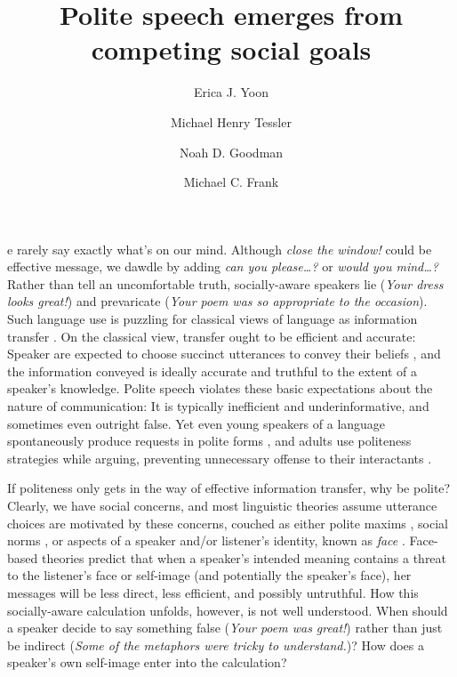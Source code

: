 \documentclass[9pt,twocolumn,twoside,lineno]{main_class_file}
\title{Polite speech emerges from competing social goals}
\author[a,1,2]{Erica J. Yoon}
\author[a,1]{ Michael Henry Tessler}
\author[a]{Noah D. Goodman}
\author[a]{Michael C. Frank}
\affil[a]{Department of Psychology, Stanford University}
\begin{document}
\maketitle
\thispagestyle{firststyle}


e rarely say exactly what's on our mind.
Although \emph{close the window!} could be effective message, we dawdle by adding \emph{can you please\ldots{}?}
or \emph{would you mind\ldots{}?}
Rather than tell an uncomfortable truth, socially-aware speakers lie (\emph{Your dress looks great!}) and
prevaricate (\emph{Your poem was so appropriate to the occasion}).
Such language use is puzzling for classical views of language as information transfer \cite{buhler1934, frank2012, jakobson1960, shannon1948}. On the classical view, transfer ought to be efficient and accurate: Speaker are expected to choose succinct utterances to convey their beliefs \cite{grice1975, searle1975}, and the information conveyed is ideally accurate and truthful to the extent of a speaker's knowledge. Polite speech violates these
basic expectations about the nature of communication: It is typically
inefficient and underinformative, and sometimes even outright false. Yet even young speakers of a language spontaneously produce
requests in polite forms \cite{axia1985}, and adults use politeness strategies while arguing,
preventing unnecessary offense to their interactants \cite{holtgraves1997}.

If politeness only gets in the way of effective information transfer, why be polite?
Clearly, we have social concerns, and most linguistic theories assume utterance choices are motivated by these concerns, couched as either polite maxims \cite{leech1983}, social norms \cite{ide1989}, or aspects of a speaker and/or listener's identity, known as \emph{face} \cite{brown1987, goffman1967}.
Face-based theories predict that when a speaker's intended meaning contains a threat to the listener's face or self-image (and potentially the speaker's face), her messages will be less direct, less efficient, and possibly untruthful.
How this socially-aware calculation unfolds, however, is not well understood.
When should a speaker decide to say something false (\emph{Your poem was great!}) rather than just be indirect (\emph{Some of the metaphors were tricky to understand.})?
How does a speaker's own self-image enter into the calculation?
\end{document}
